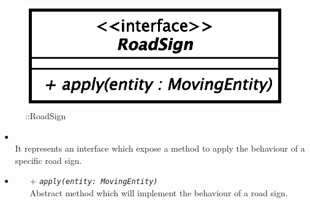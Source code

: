 \begin{figure}[h]
\centering
\includegraphics[scale=0.6,keepaspectratio]{images/solution/road_sign.eps}
\caption{\pPassive::RoadSign}
\label{fig:sd-app-road-sign}
\end{figure}
\FloatBarrier
\begin{itemize}
  \item \textbf{\descr} \\
    It represents an interface which expose a method to apply the behaviour of a specific road sign.
  \item \textbf{\ops}
  \begin{itemize} 
    \item[+] \texttt{\textit{apply(entity: MovingEntity)}} \\
Abstract method which will implement the behaviour of a road sign.
  \end{itemize}
\end{itemize}
